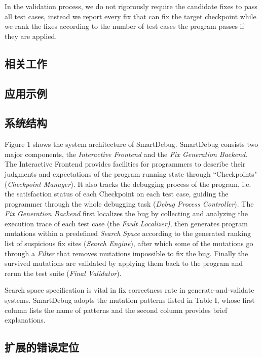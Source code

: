 In the validation process, we do not rigorously require the candidate fixes to pass all test cases, instead we report every fix that can fix the target checkpoint while we rank the fixes according to the number of test cases the program passes if they are applied.

\subsection{相关工作}%

\subsection{应用示例}%
\subsection{系统结构}%

Figure 1 shows the system architecture of SmartDebug. SmartDebug consists two major components, the \textit{Interactive Frontend} and the \textit{Fix Generation Backend}. The Interactive Frontend provides facilities for programmers to describe their judgments and expectations of the program running state through ``Checkpoints" (\textit{Checkpoint Manager}). It also tracks the debugging process of the program, i.e. the satisfaction status of each Checkpoint on each test case, guiding the programmer through the whole debugging task (\textit{Debug Process Controller}). The \textit{Fix Generation Backend} first localizes the bug by collecting and analyzing the execution trace of each test case (the \textit{Fault Localizer)}, then generates program mutations within a predefined \textit{Search Space} according to the generated ranking list of suspicious fix sites (\textit{Search Engine}), after which some of the mutations go through a \textit{Filter} that removes mutations impossible to fix the bug. Finally the survived mutations are validated by applying them back to the program and rerun the test suite (\textit{Final Validator}).

Search space specification is vital in fix correctness rate in generate-and-validate systems. SmartDebug adopts the mutation patterns listed in Table I, whose first column lists the name of patterns and the second column provides brief explanations.

\subsection{扩展的错误定位}%

